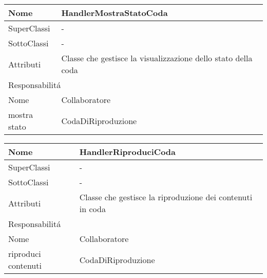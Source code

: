 \begin{center}
    \begin{tabular}{ |p{3cm}|p{3cm}|p{3cm}|p{3cm}| }
        \hline
        Nome & \multicolumn{3}{|p{9cm}|}{HandlerMostraStatoCoda} \\\hline
        SuperClassi & \multicolumn{3}{|p{9cm}|}{-} \\\hline
        SottoClassi & \multicolumn{3}{|p{9cm}|}{-} \\\hline
        Attributi & \multicolumn{3}{|p{9cm}|}{Classe che gestisce la visualizzazione dello stato della coda} \\\hline
        \multicolumn{4}{|p{12cm}|}{Responsabilit\'a} \\\hline
        \multicolumn{2}{|p{6cm}|}{Nome} & \multicolumn{2}{|p{6cm}|}{Collaboratore} \\\hline
        \multicolumn{2}{|p{6cm}|}{mostra stato} & \multicolumn{2}{|p{6cm}|}{CodaDiRiproduzione} \\\hline
    \end{tabular}
\end{center}

\begin{center}
    \begin{tabular}{ |p{3cm}|p{3cm}|p{3cm}|p{3cm}| }
        \hline
        Nome & \multicolumn{3}{|p{9cm}|}{HandlerRiproduciCoda} \\\hline
        SuperClassi & \multicolumn{3}{|p{9cm}|}{-} \\\hline
        SottoClassi & \multicolumn{3}{|p{9cm}|}{-} \\\hline
        Attributi & \multicolumn{3}{|p{9cm}|}{Classe che gestisce la riproduzione dei contenuti in coda} \\\hline
        \multicolumn{4}{|p{12cm}|}{Responsabilit\'a} \\\hline
        \multicolumn{2}{|p{6cm}|}{Nome} & \multicolumn{2}{|p{6cm}|}{Collaboratore} \\\hline
        \multicolumn{2}{|p{6cm}|}{riproduci contenuti} & \multicolumn{2}{|p{6cm}|}{CodaDiRiproduzione} \\\hline
    \end{tabular}
\end{center}

